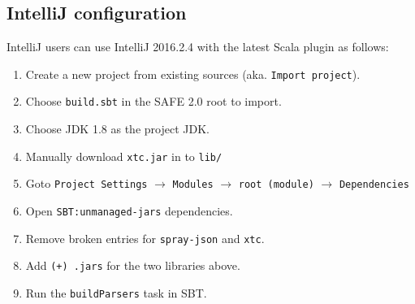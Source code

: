 \subsection{IntelliJ configuration}
IntelliJ users can use IntelliJ 2016.2.4 with the latest Scala plugin as follows:
\begin{enumerate}
\item Create a new project from existing sources (aka. \verb!Import project!).
\item Choose \verb!build.sbt! in the SAFE 2.0 root to import.
\item Choose JDK 1.8 as the project JDK.
\item Manually download \verb!xtc.jar! in to \verb!lib/!
\item Goto \verb!Project Settings! $\rightarrow$ \verb!Modules! $\rightarrow$
\verb!root (module)! $\rightarrow$ \verb!Dependencies!
\item Open \verb!SBT:unmanaged-jars! dependencies.
\item Remove broken entries for \verb!spray-json! and \verb!xtc!.
\item Add \verb!(+) .jars! for the two libraries above.
\item Run the \verb!buildParsers! task in SBT.
\end{enumerate}
